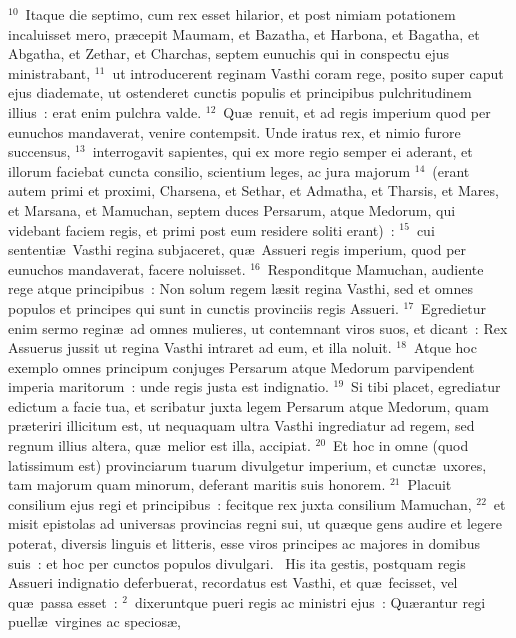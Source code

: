 ${}^{10}$~Itaque die septimo, cum rex esset hilarior, et post nimiam potationem incaluisset mero, pr\ae cepit Maumam, et Bazatha, et Harbona, et Bagatha, et Abgatha, et Zethar, et Charchas, septem eunuchis qui in conspectu ejus ministrabant,
${}^{11}$~ut introducerent reginam Vasthi coram rege, posito super caput ejus diademate, ut ostenderet cunctis populis et principibus pulchritudinem illius~: erat enim pulchra valde.
${}^{12}$~Qu\ae\ renuit, et ad regis imperium quod per eunuchos mandaverat, venire contempsit. Unde iratus rex, et nimio furore succensus,
${}^{13}$~interrogavit sapientes, qui ex more regio semper ei aderant, et illorum faciebat cuncta consilio, scientium leges, ac jura majorum
${}^{14}$~(erant autem primi et proximi, Charsena, et Sethar, et Admatha, et Tharsis, et Mares, et Marsana, et Mamuchan, septem duces Persarum, atque Medorum, qui videbant faciem regis, et primi post eum residere soliti erant)~:
${}^{15}$~cui sententi\ae\ Vasthi regina subjaceret, qu\ae\ Assueri regis imperium, quod per eunuchos mandaverat, facere noluisset.
${}^{16}$~Responditque Mamuchan, audiente rege atque principibus~: Non solum regem l\ae sit regina Vasthi, sed et omnes populos et principes qui sunt in cunctis provinciis regis Assueri.
${}^{17}$~Egredietur enim sermo regin\ae\ ad omnes mulieres, ut contemnant viros suos, et dicant~: Rex Assuerus jussit ut regina Vasthi intraret ad eum, et illa noluit.
${}^{18}$~Atque hoc exemplo omnes principum conjuges Persarum atque Medorum parvipendent imperia maritorum~: unde regis justa est indignatio.
${}^{19}$~Si tibi placet, egrediatur edictum a facie tua, et scribatur juxta legem Persarum atque Medorum, quam pr\ae teriri illicitum est, ut nequaquam ultra Vasthi ingrediatur ad regem, sed regnum illius altera, qu\ae\ melior est illa, accipiat.
${}^{20}$~Et hoc in omne (quod latissimum est) provinciarum tuarum divulgetur imperium, et cunct\ae\ uxores, tam majorum quam minorum, deferant maritis suis honorem.
${}^{21}$~Placuit consilium ejus regi et principibus~: fecitque rex juxta consilium Mamuchan,
${}^{22}$~et misit epistolas ad universas provincias regni sui, ut qu\ae que gens audire et legere poterat, diversis linguis et litteris, esse viros principes ac majores in domibus suis~: et hoc per cunctos populos divulgari.
~\lettrine[lines=10,image=true,loversize=0.05,lraise=-0.03]{H}{}is ita gestis, postquam regis Assueri indignatio deferbuerat, recordatus est Vasthi, et qu\ae\ fecisset, vel qu\ae\ passa esset~:
${}^{2}$~dixeruntque pueri regis ac ministri ejus~: Qu\ae rantur regi puell\ae\ virgines ac specios\ae ,
